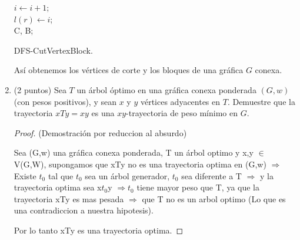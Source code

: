 \documentclass{article}
\begin{document}
\begin{enumerate}
\begin{algorithm}[H]
    $i \leftarrow i+1$;\\
    $l(r) \leftarrow i$;\\
    \Return C, B;
    \caption{DFS-CutVertexBlock.}
  \end{algorithm}
  
  Así obtenemos los vértices de corte y los bloques de una gráfica $G$ conexa.\\
  
\item (2 puntos) Sea $T$ un \'arbol \'optimo en una gr\'afica conexa
  ponderada $(G,w)$ (con pesos positivos), y sean $x$ y $y$ v\'ertices
  adyacentes en $T$. Demuestre que la trayectoria $xTy = xy$ es una
  $xy$-trayectoria de peso m\'inimo en $G$.
  
  \begin{proof} 
    (Demostración por reduccion al absurdo)
    
    Sea (G,w) una gráfica conexa ponderada, T un árbol optimo y x,y $\in$V(G,W),
    supongamos que xTy no es una trayectoria optima en (G,w) $\Longrightarrow$
    Existe $t_0$ tal que  $t_0$ sea un árbol generador, $t_0$ sea diferente a
    T $\Longrightarrow$ y la trayectoria optima sea x$t_0$y $\Longrightarrow t_0$
    tiene mayor peso que T, ya que la trayectoria xTy es mas pesada
    $\Longrightarrow$ que T no es un arbol optimo (Lo que es una contradiccion
    a nuestra hipotesis).
    
    
    Por lo tanto xTy es una trayectoria optima.
    

\end{proof}
\end{enumerate}
\end{document}
